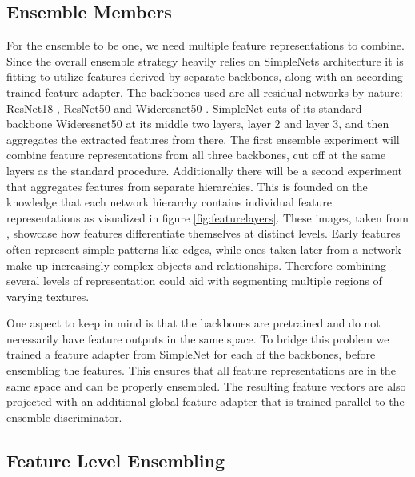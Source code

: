 \subsection{Ensemble Members}
\label{sec:ensemblecandidates}

For the ensemble to be one, we need multiple feature representations to combine. Since the overall ensemble strategy heavily relies on SimpleNets \cite{liu2023simplenet} architecture 
it is fitting to utilize features derived by separate backbones, along with an according trained feature adapter.\newline
The backbones used are all residual networks by nature: ResNet18 \cite{He_2016resnet}, ResNet50 \cite{He_2016resnet} and Wideresnet50 \cite{wideresnet}. SimpleNet cuts of its 
standard backbone Wideresnet50 at its middle two layers, layer 2 and layer 3, and then aggregates the extracted features from there. The first ensemble experiment will combine 
feature representations from all three backbones, cut off at the same layers as the standard procedure. Additionally there will be a second experiment that aggregates features 
from separate hierarchies. This is founded on the knowledge that each network hierarchy contains individual feature representations as visualized in figure \ref{fig:featurelayers}. 
These images, taken from \cite{openaifeaturerepres}, showcase how features differentiate themselves at distinct levels. Early features often represent simple patterns like edges, 
while ones taken later from a network make up increasingly complex objects and relationships. Therefore combining several levels of representation could aid with segmenting 
multiple regions of varying textures.



One aspect to keep in mind is that the backbones are pretrained and do not necessarily have feature outputs in the same space. 
To bridge this problem we trained a feature adapter from SimpleNet for each of the backbones, before ensembling the features. 
This ensures that all feature representations are in the same space and can be properly ensembled. The resulting feature vectors are also projected with an additional global 
feature adapter that is trained parallel to the ensemble discriminator.


\subsection{Feature Level Ensembling}
\label{sec:featurelevelensemble}

